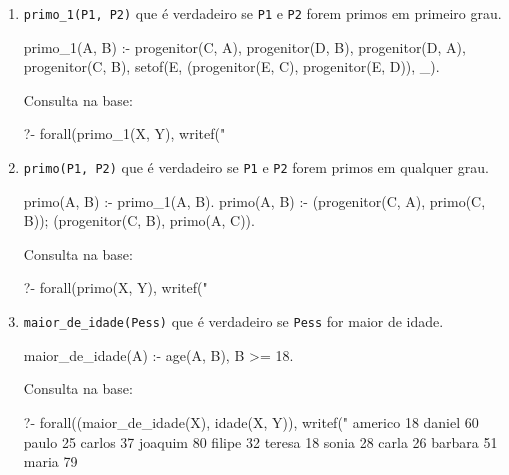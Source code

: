 \documentclass[10pt, twoside]{article}          %
\newenvironment{proof*}[1][proof*]              %
  {\proof[#1]\vspace{0.5em}\vspace*{-\baselineskip}
  \hspace{\parindent}\leftskip=.5cm\rightskip=.5cm}
  {\vspace*{-1.5\baselineskip}
  
  \rightskip=0cm\endproof}
\begin{document}
\begin{multicols*}{2}
\begin{enumerate}
\begin{proof*}[\unskip\nopunct]
\begin{enumerate}
      \item \texttt{primo\_1(P1, P2)} que é verdadeiro se \texttt{P1} e \texttt{P2} forem primos em 
      primeiro grau.

        \begin{pseudocode}[gobble=10]
          primo_1(A, B) :-
              progenitor(C, A),
              progenitor(D, B),
              \+ progenitor(D, A),
              \+ progenitor(C, B),
              setof(E, (progenitor(E, C), progenitor(E, D)), _).
        \end{pseudocode}

        Consulta na base:
        \begin{pseudocode}[gobble=10]
          ?- forall(primo_1(X, Y), writef("%
        \end{pseudocode}

      \item \texttt{primo(P1, P2)} que é verdadeiro se \texttt{P1} e \texttt{P2} forem primos em 
      qualquer grau.

        \begin{pseudocode}[gobble=10]
          primo(A, B) :-
              primo_1(A, B).
          primo(A, B) :-
              (progenitor(C, A), primo(C, B));
              (progenitor(C, B), primo(A, C)).
        \end{pseudocode}

        Consulta na base:
        \begin{pseudocode}[gobble=10]
          ?- forall(primo(X, Y), writef("%
        \end{pseudocode}

      \item \texttt{maior\_de\_idade(Pess)} que é verdadeiro se \texttt{Pess} for maior de idade. 

        \begin{pseudocode}[gobble=10]
          maior_de_idade(A) :-
              age(A, B),
              B >= 18.
        \end{pseudocode}

        Consulta na base:
        \begin{pseudocode}[gobble=10]
          ?- forall((maior_de_idade(X), idade(X, Y)), 
                    writef("%
          americo 18
          daniel 60
          paulo 25
          carlos 37
          joaquim 80
          filipe 32
          teresa 18
          sonia 28
          carla 26
          barbara 51
          maria 79
        \end{pseudocode}


\end{enumerate}
\end{proof*}
\end{enumerate}
\end{multicols*}
\end{document}
